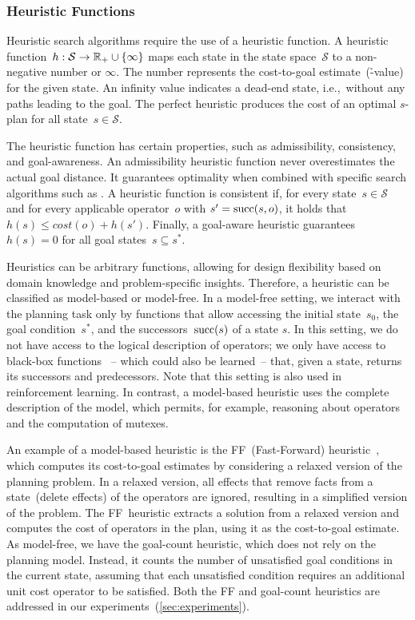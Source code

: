 \subsubsection{Heuristic Functions}
\label{sec:heuristic-functions}

Heuristic search algorithms require the use of a heuristic function. A heuristic function~$h:\mathcal{S}\rightarrow\mathbb{R}_{+}\cup\{\infty\}$ maps each state in the state space~$\mathcal{S}$ to a non-negative number or $\infty$. The number represents the cost-to-goal estimate~(\h-value) for the given state. An infinity value indicates a dead-end state, i.e.,~without any paths leading to the goal. The perfect heuristic \hstar produces the cost of an optimal $s$-plan for all state~$s \in \mathcal{S}$.

The heuristic function has certain properties, such as admissibility, consistency, and goal-awareness. An admissibility heuristic function never overestimates the actual goal distance. It guarantees optimality when combined with specific search algorithms such as \astar. A heuristic function is consistent if, for every state~$s \in \mathcal{S}$ and for every applicable operator~$o$ with $s' = \operatorname{succ}(s,o)$, it holds that $h(s) \leq cost(o) + h(s')$. Finally, a goal-aware heuristic guarantees $h(s) = 0$ for all goal states~$s \subseteq s^*$.

Heuristics can be arbitrary functions, allowing for design flexibility based on domain knowledge and problem-specific insights. Therefore, a heuristic can be classified as model-based or model-free. In a model-free setting, we interact with the planning task only by functions that allow accessing the initial state~$s_0$, the goal condition~$s^*$, and the successors~$\operatorname{succ}(s)$ of a state $s$. In this setting, we do not have access to the logical description of operators; we only have access to black-box functions~\cite{sturtevant2019exponential} -- which could also be learned~-- that, given a state, returns its successors and predecessors. Note that this setting is also used in reinforcement learning. In contrast, a model-based heuristic uses the complete description of the model, which permits, for example, reasoning about operators and the computation of mutexes.

An example of a model-based heuristic is the FF~(Fast-Forward) heuristic~\cite{hoffmann2001ff}, which computes its cost-to-goal estimates by considering a relaxed version of the planning problem. In a relaxed version, all effects that remove facts from a state~(delete effects) of the operators are ignored, resulting in a simplified version of the problem. The FF~heuristic extracts a solution from a relaxed version and computes the cost of operators in the plan, using it as the cost-to-goal estimate. As model-free, we have the goal-count heuristic, which does not rely on the planning model. Instead, it counts the number of unsatisfied goal conditions in the current state, assuming that each unsatisfied condition requires an additional unit cost operator to be satisfied. Both the FF and goal-count heuristics are addressed in our experiments~(\cref{sec:experiments}).

